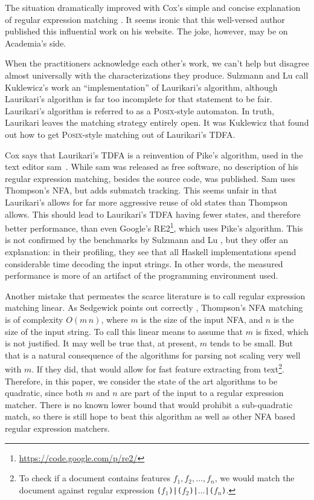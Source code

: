 \documentclass[11pt]{Thesis}
\theoremstyle{definition}
\begin{document}
The situation dramatically improved with Cox's simple and concise
explanation of regular expression matching \cite{Cox07a}. It seems
ironic that this well-versed author published this influential work
on his website. The joke, however, may be on Academia's side.

When the practitioners acknowledge each other's work, we can't
help but disagree almost universally with the characterizations they
produce. Sulzmann and Lu \cite{Sulz12a} call Kuklewicz's
work an ``implementation'' of Laurikari's algorithm, although Laurikari's
algorithm is far too incomplete for that statement to be fair. Laurikari's
algorithm is referred to as a \textsc{Posix}-style automaton. In truth, Laurikari
leaves the matching strategy entirely open. It was Kuklewicz that
found out how to get \textsc{Posix}-style matching out of Laurikari's TDFA. 

Cox says that Laurikari's TDFA is a reinvention of Pike's algorithm,
used in the text editor sam~\cite{Pike87a}.  While sam was released
as free software, no description of his regular expression matching,
besides the source code, was published.  Sam uses Thompson's NFA,
but adds submatch tracking. This seems unfair in that Laurikari's
allows for far more aggressive reuse of old states than Thompson
allows. This should lead to Laurikari's TDFA having fewer states,
and therefore better performance, than even Google's
RE2\footnote{\url{https://code.google.com/p/re2/}}, which uses
Pike's algorithm. This is not confirmed by the benchmarks by
Sulzmann and Lu \cite{Sulz12a}, but they offer an explanation: in
their profiling, they see that all Haskell implementations spend
considerable time decoding the input strings. In other words, the
measured performance is more of an artifact of the programming
environment used.

Another mistake that permeates the scarce literature is to call
regular expression matching linear. As Sedgewick points out correctly
\cite{Sedg90a}, Thompson's NFA matching is of complexity $O(m\, n)$,
where $m$ is the size of the input NFA, and $n$ is the size of the
input string. To call this linear means to assume that $m$ is fixed,
which is not justified. It may well be true that, at present, $m$
tends to be small. But that is a natural consequence of the algorithms for
parsing not scaling very well with $m$. If they did, that would allow for
fast feature extracting from text\footnote{To check if a document
contains features $f_1, f_2, \dots, f_n$, we would match the document
against regular expression \texttt{($f_1$)|($f_2$)|$\dots$|($f_n$)}.}.
Therefore, in this paper, we consider the state of the art algorithms
to be quadratic, since both $m$ and $n$ are part of the input to a
regular expression matcher. There is no known lower bound that would prohibit 
a sub-quadratic match, so there is still hope to beat this algorithm as well 
as other NFA based regular expression matchers.
\end{document}
